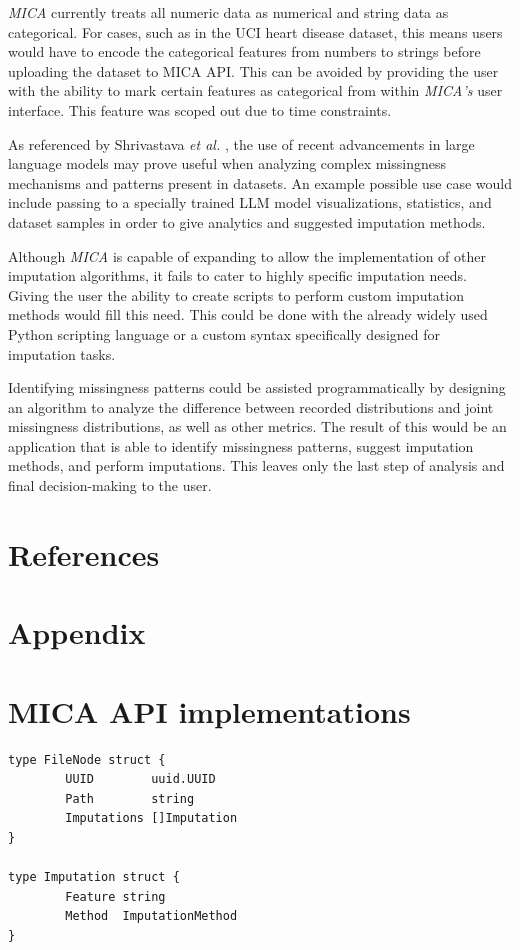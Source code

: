 \documentclass[a4paper, 11pt]{article}
\newcommand{\etal}{\textit{et al. }}
\newcommand{\mica}{\textit{MICA }}
\newcommand{\micas}{\textit{MICA's }}
\begin{document}
\mica currently treats all numeric data as numerical and string data as
categorical. For cases, such as in the UCI heart disease dataset, this means
users would have to encode the categorical features from numbers to strings
before uploading the dataset to MICA API. This can be avoided by providing the
user with the ability to mark certain features as categorical from within \micas
user interface. This feature was scoped out due to time constraints.

As referenced by Shrivastava \etal \cite{shrivastava_impute-vss_2025}, the use
of recent advancements in large language models may prove useful when analyzing
complex missingness mechanisms and patterns present in datasets. An example
possible use case would include passing to a specially trained LLM model
visualizations, statistics, and dataset samples in order to give analytics and
suggested imputation methods.

Although \mica is capable of expanding to allow the implementation of other
imputation algorithms, it fails to cater to highly specific imputation needs.
Giving the user the ability to create scripts to perform custom imputation
methods would fill this need. This could be done with the already widely
used Python scripting language or a custom syntax specifically designed for
imputation tasks.

Identifying missingness patterns could be assisted programmatically by
designing an algorithm to analyze the difference between recorded distributions
and joint missingness distributions, as well as other metrics. The result of
this would be an application that is able to identify missingness
patterns, suggest imputation methods, and perform imputations. This leaves only
the last step of analysis and final decision-making to the user.


\newpage
\section{References}



\section{Appendix}
\appendix

\section{MICA API implementations}
\begin{program}[H]
\begin{verbatim}
type FileNode struct {
        UUID        uuid.UUID
        Path        string
        Imputations []Imputation
}

type Imputation struct {
        Feature string           
        Method  ImputationMethod 
}
\end{verbatim}
\caption{Internal MICA API implementation data structure for imputation versioning system}
\end{program}
\end{document}
